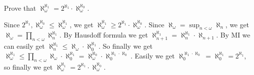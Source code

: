 \documentclass{ctexart}
\begin{document}
\begin{problem}
Prove that \(\aleph_\omega^{\aleph_1}=2^{\aleph_1}\cdot \aleph_\omega^{\aleph_0}\).
\end{problem}

\begin{solution}
	Since \(2^{\aleph_1},\aleph_\omega^{\aleph_0} \leq \aleph_\omega^{\aleph_1}\), we get \(\aleph_\omega^{\aleph_1}\geq 2^{\aleph_1}\cdot \aleph_\omega^{\aleph_0}\).
	Since \(\aleph_\omega=\sup_{n<\omega}\aleph_n\), we get \(\aleph_\omega=\prod_{n<\omega} \aleph_n^{\aleph_1}\).
	By Hausdoff formula we get \(\aleph_{n+1}^{\aleph_1}=\aleph_n^{\aleph_1} \cdot \aleph_{n+1}\).
	By MI we can easily get \(\aleph_n^{\aleph_1}\leq \aleph_{\omega}\cdot \aleph_0^{\aleph_1}\).
	So finally we get \(\aleph_\omega^{\aleph_1}\leq \prod_{n<\omega} \aleph_{\omega}\cdot \aleph_0^{\aleph_1}=\aleph_\omega^{\aleph_0}\cdot \aleph_0^{\aleph_1 \cdot \aleph_0}\).
	Easily we get \(\aleph_0^{\aleph_1 \cdot \aleph_0}=\aleph_0^{\aleph_1}=2^{\aleph_1}\),
	so finally we get \(\aleph_\omega^{\aleph_1}=2^{\aleph_1} \cdot \aleph_\omega^{\aleph_0}\).
\end{solution}
\end{document}
